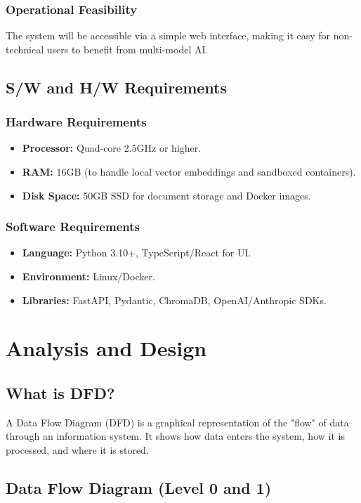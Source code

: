 \documentclass[12pt, a4paper]{report}
\begin{document}
\subsection{Operational Feasibility}
The system will be accessible via a simple web interface, making it easy for non-technical users to benefit from multi-model AI.

\section{S/W and H/W Requirements}
\subsection{Hardware Requirements}
\begin{itemize}
    \item \textbf{Processor:} Quad-core 2.5GHz or higher.
    \item \textbf{RAM:} 16GB (to handle local vector embeddings and sandboxed containers).
    \item \textbf{Disk Space:} 50GB SSD for document storage and Docker images.
\end{itemize}

\subsection{Software Requirements}
\begin{itemize}
    \item \textbf{Language:} Python 3.10+, TypeScript/React for UI.
    \item \textbf{Environment:} Linux/Docker.
    \item \textbf{Libraries:} FastAPI, Pydantic, ChromaDB, OpenAI/Anthropic SDKs.
\end{itemize}

\chapter{Analysis and Design}

\section{What is DFD?}
A Data Flow Diagram (DFD) is a graphical representation of the "flow" of data through an information system. It shows how data enters the system, how it is processed, and where it is stored.

\section{Data Flow Diagram (Level 0 and 1)}
\end{document}

